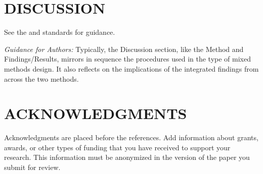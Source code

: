 \documentclass[acmsmall]{acmart}
\begin{document}
\section{DISCUSSION}
See the \hyperlink{https://apastyle.apa.org/jars/quantitative}{\color{blue}{JARS-QUANT}} and \hyperlink{https://apastyle.apa.org/jars/qualitative}{\color{blue}{JARS-QUAL}} standards for guidance.

\textit{Guidance for Authors:} Typically, the Discussion section, like the Method and Findings/Results, mirrors in sequence the procedures used in the type of mixed methods design. It also reflects on the implications of the integrated findings from across the two methods.

\section{ACKNOWLEDGMENTS}
Acknowledgments are placed before the references. Add information about grants, awards, or other types of funding that you have received to support your research. This information must be anonymized in the version of the paper you submit for review.




\appendix
\end{document}
